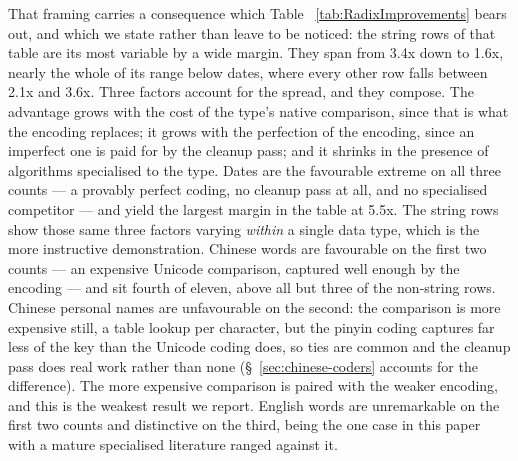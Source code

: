 \documentclass[twoside,leqno,twocolumn]{article}
\begin{document}
That framing carries a consequence which Table ~\ref{tab:RadixImprovements} bears out,
and which we state rather than leave to be noticed:
the string rows of that table are its most variable by a wide margin.
They span from 3.4x down to 1.6x, nearly the whole of its range below dates,
where every other row falls between 2.1x and 3.6x.
Three factors account for the spread, and they compose.
The advantage grows with the cost of the type's native comparison, since that is what the encoding replaces;
it grows with the perfection of the encoding, since an imperfect one is paid for by the cleanup pass;
and it shrinks in the presence of algorithms specialised to the type.
Dates are the favourable extreme on all three counts --- a provably perfect coding, no cleanup pass at all,
and no specialised competitor --- and yield the largest margin in the table at 5.5x.
The string rows show those same three factors varying \emph{within} a single data type,
which is the more instructive demonstration.
Chinese words are favourable on the first two counts --- an expensive Unicode comparison,
captured well enough by the encoding --- and sit fourth of eleven, above all but three of the non-string rows.
Chinese personal names are unfavourable on the second: the comparison is more expensive still,
a table lookup per character, but the pinyin coding captures far less of the key than the Unicode
coding does, so ties are common and the cleanup pass does real work rather than none
(\S~\ref{sec:chinese-coders} accounts for the difference).
The more expensive comparison is paired with the weaker encoding, and this is the weakest result we report.
English words are unremarkable on the first two counts and distinctive on the third,
being the one case in this paper with a mature specialised literature ranged against it.
\end{document}

